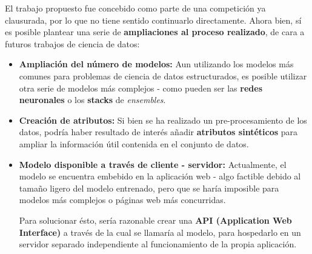 El trabajo propuesto fue concebido como parte de una competición ya clausurada, por lo que no tiene sentido continuarlo directamente. Ahora bien, sí es posible plantear una serie de \textbf{ampliaciones al proceso realizado}, de cara a futuros trabajos de ciencia de datos:
\begin{itemize}[parsep=2pt, itemsep=2pt, topsep=4pt]
	\item \textbf{Ampliación del número de modelos:} Aun utilizando los modelos más comunes para problemas de ciencia de datos estructurados, es posible utilizar otra serie de modelos más complejos - como pueden ser las \textbf{redes neuronales} o los \textbf{stacks} de \textit{ensembles}.
	\item \textbf{Creación de atributos:} Si bien se ha realizado un pre-procesamiento de los datos, podría haber resultado de interés añadir \textbf{atributos sintéticos} para ampliar la información útil contenida en el conjunto de datos.
	\item \textbf{Modelo disponible a través de cliente - servidor:} Actualmente, el modelo se encuentra embebido en la aplicación web - algo factible debido al tamaño ligero del modelo entrenado, pero que se haría imposible para modelos más complejos o páginas web más concurridas.
	
	Para solucionar ésto, sería razonable crear una \textbf{API (Application Web Interface)} a través de la cual se llamaría al modelo, para hospedarlo en un servidor separado independiente al funcionamiento de la propia aplicación.
\end{itemize}